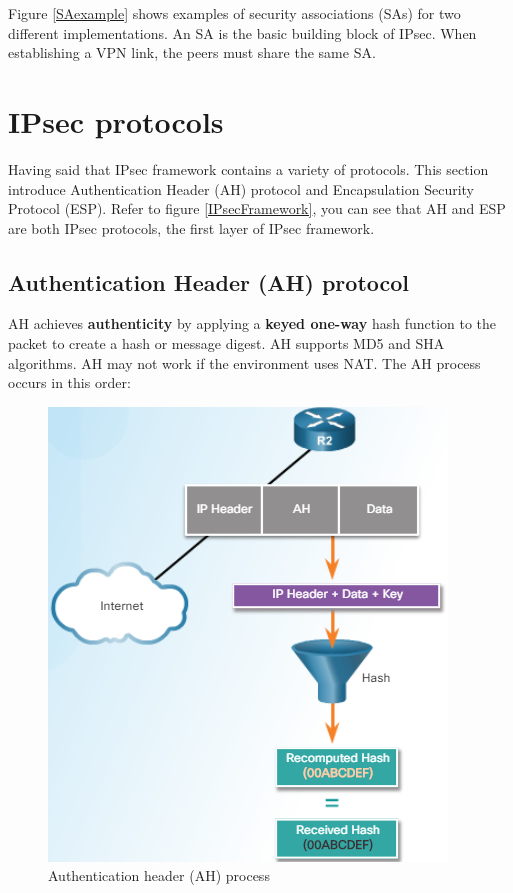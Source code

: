 Figure \ref{SAexample} shows examples of security associations (SAs) for two different implementations. An SA is the basic building block of IPsec. When establishing a VPN link, the peers must share the same SA. 

\section{IPsec protocols}

Having said that IPsec framework contains a variety of protocols. This section introduce Authentication Header (AH) protocol and Encapsulation Security Protocol (ESP). Refer to figure \ref{IPsecFramework}, you can see that AH and ESP are both IPsec protocols, the first layer of IPsec framework.

\subsection{Authentication Header (AH) protocol}

AH achieves \textbf{authenticity} by applying a \textbf{keyed one-way} hash function to the packet to create a hash or message digest. AH supports MD5 and SHA algorithms. AH may not work if the environment uses NAT. The AH process occurs in this order:

\begin{figure}[hbtp]
\caption{Authentication header (AH) process}\label{AHproto}
\centering
\includegraphics[scale=1]{pictures/AHproto.PNG}
\end{figure}


